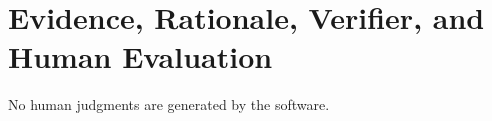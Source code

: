 \section{Evidence, Rationale, Verifier, and Human Evaluation}



No human judgments are generated by the software.
